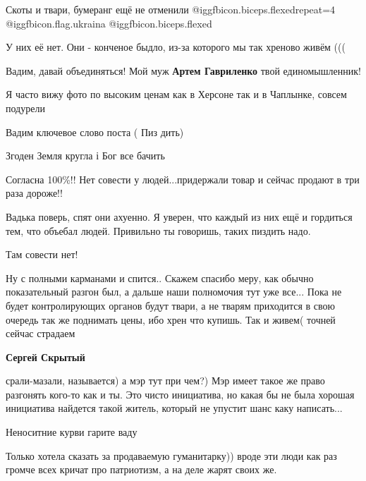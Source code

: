  
 
 
 
 
\zzSecCmt

\begin{itemize} %
Скоты и твари, бумеранг ещё не отменили  @igg{fbicon.biceps.flexed}{repeat=4}
@igg{fbicon.flag.ukraina} @igg{fbicon.biceps.flexed} 

У них её нет. Они - конченое быдло, из-за которого мы так хреново живём (((

Вадим, давай объединяться! Мой муж \textbf{Артем Гавриленко} твой единомышленник!

Я часто вижу фото по высоким ценам как в Херсоне так и в Чаплынке, совсем подурели

Вадим ключевое слово поста ( Пиз дить)

Згоден
Земля кругла і Бог все бачить

Согласна 100\%!! Нет совести у людей...придержали товар и сейчас продают в три раза дороже!!


Вадька поверь, спят они ахуенно. Я уверен, что каждый из них ещё и гордиться
тем, что объебал людей. Привильно ты говоришь, таких пиздить надо.

Там совести нет!


Ну с полными карманами и спится.. Скажем спасибо меру, как обычно показательный
разгон был, а дальше наши полномочия тут уже все... Пока не будет
контролирующих органов будут твари, а не тварям приходится в свою очередь так
же поднимать цены, ибо хрен что купишь. Так и живем( точней сейчас страдаем

\textbf{Сергей Скрытый} 

срали-мазали, называется) а мэр тут при чем?) Мэр имеет такое же право
разгонять кого-то как и ты. Это чисто инициатива, но какая бы не была хорошая
инициатива найдется такой житель, который не упустит шанс каку написать...

Неноситние курви гарите ваду


Только хотела сказать за продаваемую гуманитарку)) вроде эти люди как раз
громче всех кричат про патриотизм, а на деле жарят своих же.

\end{itemize} %
